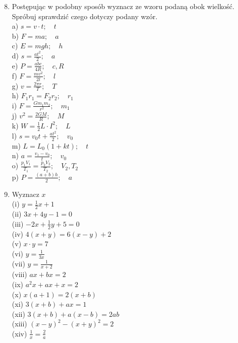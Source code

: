 \documentclass[10pt]{article}
\begin{document}
\begin{enumerate}
  \setcounter{enumi}{7}
  \item Postępując w podobny sposób wyznacz ze wzoru podaną obok wielkość. Spróbuj sprawdzić czego dotyczy podany wzór.\\
a) \(s=v \cdot t ; \quad t\)\\
b) \(F=m a ; \quad a\)\\
c) \(E=m g h ; \quad h\)\\
d) \(s=\frac{a t^{2}}{2} ; \quad a\)\\
e) \(P=\frac{a b c}{4 R} ; \quad c, R\)\\
f) \(F=\frac{m v^{2}}{2 l} ; \quad l\)\\
g) \(v=\frac{2 \pi r}{T} ; \quad T\)\\
h) \(F_{1} r_{1}=F_{2} r_{2} ; \quad r_{1}\)\\
i) \(F=\frac{G m_{1} m_{2}}{r^{2}} ; \quad m_{1}\)\\
j) \(v^{2}=\frac{2 G M}{R} ; \quad M\)\\
k) \(W=\frac{1}{2} L \cdot I^{2} ; \quad L\)\\
l) \(s=v_{0} t+\frac{a t^{2}}{2} ; \quad v_{0}\)\\
m) \(L=L_{0}(1+k t) ; \quad t\)\\
n) \(a=\frac{v_{1}-v_{0}}{t} ; \quad v_{0}\)\\
o) \(\frac{p_{1} V_{1}}{T_{1}}=\frac{p_{2} V_{2}}{T_{2}} ; \quad V_{2}, T_{2}\)\\
p) \(P=\frac{(a+b) h}{2} ; \quad a\)
  \item Wyznacz \(x\)\\
(i) \(y=\frac{1}{2} x+1\)\\
(ii) \(3 x+4 y-1=0\)\\
(iii) \(-2 x+\frac{1}{2} y+5=0\)\\
(iv) \(4(x+y)=6(x-y)+2\)\\
(v) \(x \cdot y=7\)\\
(vi) \(y=\frac{1}{3 x}\)\\
(vii) \(y=\frac{1}{x+2}\)\\
(viii) \(a x+b x=2\)\\
(ix) \(a^{2} x+a x+x=2\)\\
(x) \(x(a+1)=2(x+b)\)\\
(xi) \(3(x+b)+a x=1\)\\
(xii) \(3(x+b)+a(x-b)=2 a b\)\\
(xiii) \((x-y)^{2}-(x+y)^{2}=2\)\\
(xiv) \(\frac{1}{x}=\frac{2}{a}\)\\

\end{enumerate}
\end{document}
